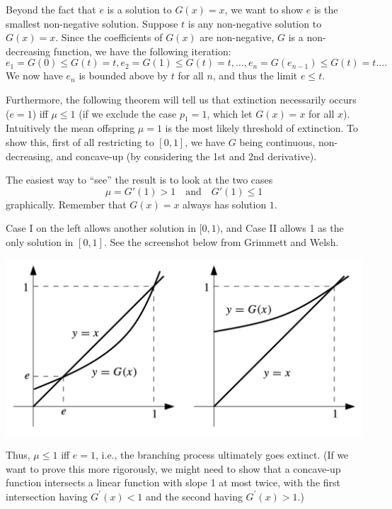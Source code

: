 \documentclass[11pt]{article}
\begin{document}
Beyond the fact that $e$ is a solution to $G(x)=x$, we want to show $e$ is the smallest non-negative solution. Suppose $t$ is any non-negative solution to $G(x)=x$. Since the coefficients of $G(x)$ are non-negative, $G$ is a non-decreasing function, we have the following iteration:
\[
e_{1}=G(0)\leq G(t)=t,
e_{2}=G(1)\leq G(t)=t,
\dots ,
e_{n}=G(e_{n- 1})\leq G(t)=t\dots .
\]
We now have $e_{n}$ is bounded above by $t$ for all $n$, and thus the limit $e\leq t$.

Furthermore, the following theorem will tell us that extinction necessarily occurs ($e=1$) iff $\mu \leq 1$ (if we exclude the case $p_{1}=1$, which let $G(x)=x$ for all $x$). Intuitively the mean offspring $\mu =1$ is the most likely threshold of extinction. To show this, first of all restricting to $[0,1]$, we have $G$ being continuous, non-decreasing, and concave-up (by considering the 1st and 2nd derivative).

The easiest way to “see” the result is to look at the two cases
\[
\mu =G'(1)>1 \quad \text{and} \quad G'(1)\leq 1
\]
graphically. Remember that $G(x)=x$ always has solution $1$.

Case I on the left allows another solution in $[0,1)$, and Case II allows 1 as the only solution in $[0,1]$. See the screenshot below from Grimmett and Welsh. 

\includegraphics[scale = 0.38]{extinction}

Thus, $\mu \leq 1$ iff $e=1$, i.e., the branching process ultimately goes extinct. (If we want to prove this more rigorously, we might need to show that a concave-up function intersects a linear function with slope 1 at most twice, with the first intersection having $G^{' }(x)<1$ and the second having $G^{' }(x)>1$.)



\end{document}

